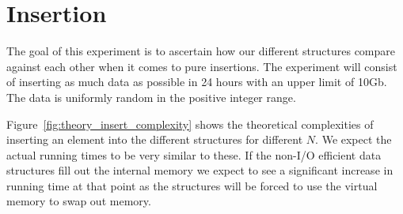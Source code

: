\documentclass[twoside,11pt,openright]{report}
\begin{document}
\clearpage

\section{Insertion}
\label{src:insertion}
The goal of this experiment is to ascertain how our different structures compare against each other when it comes to pure insertions. The experiment will consist of inserting as much data as possible in 24 hours with an upper limit of 10Gb. The data is uniformly random in the positive integer range.

Figure~\ref{fig:theory_insert_complexity} shows the theoretical complexities of inserting an element into the different structures for different $N$. We expect the actual running times to be very similar to these. If the non-I/O efficient data structures fill out the internal memory we expect to see a significant increase in running time at that point as the structures will be forced to use the virtual memory to swap out memory.
\end{document}
